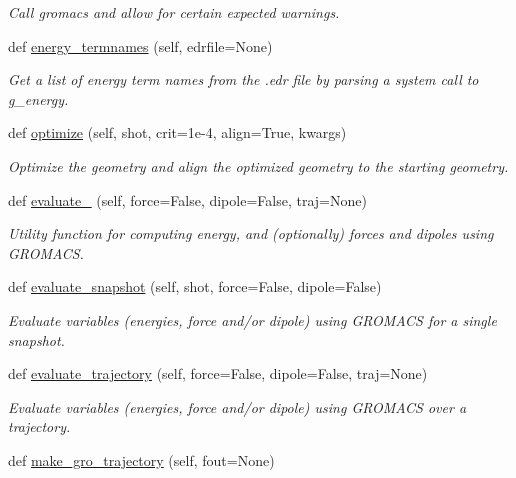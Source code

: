 \begin{DoxyCompactItemize}
\begin{DoxyCompactList}\small\item\em Call gromacs and allow for certain expected warnings. \end{DoxyCompactList}\item 
def \hyperlink{classsrc_1_1gmxio_1_1GMX_aa2907fefccf0791846d2bc87f38ef5fe}{energy\+\_\+termnames} (self, edrfile=None)
\begin{DoxyCompactList}\small\item\em Get a list of energy term names from the .edr file by parsing a system call to g\+\_\+energy. \end{DoxyCompactList}\item 
def \hyperlink{classsrc_1_1gmxio_1_1GMX_a92d0a874a4b720617b984cfb3f3117cf}{optimize} (self, shot, crit=1e-\/4, align=\+True, kwargs)
\begin{DoxyCompactList}\small\item\em Optimize the geometry and align the optimized geometry to the starting geometry. \end{DoxyCompactList}\item 
def \hyperlink{classsrc_1_1gmxio_1_1GMX_aece1608d0fc0b3a2a121edb09ac30f75}{evaluate\+\_\+} (self, force=False, dipole=False, traj=None)
\begin{DoxyCompactList}\small\item\em Utility function for computing energy, and (optionally) forces and dipoles using G\+R\+O\+M\+A\+CS. \end{DoxyCompactList}\item 
def \hyperlink{classsrc_1_1gmxio_1_1GMX_ac5273754ebbd61d4798b4acc4f4479bc}{evaluate\+\_\+snapshot} (self, shot, force=False, dipole=False)
\begin{DoxyCompactList}\small\item\em Evaluate variables (energies, force and/or dipole) using G\+R\+O\+M\+A\+CS for a single snapshot. \end{DoxyCompactList}\item 
def \hyperlink{classsrc_1_1gmxio_1_1GMX_ab183586fa000692169f9904269add851}{evaluate\+\_\+trajectory} (self, force=False, dipole=False, traj=None)
\begin{DoxyCompactList}\small\item\em Evaluate variables (energies, force and/or dipole) using G\+R\+O\+M\+A\+CS over a trajectory. \end{DoxyCompactList}\item 
def \hyperlink{classsrc_1_1gmxio_1_1GMX_a359787564e21019ed5baa7e436f0e523}{make\+\_\+gro\+\_\+trajectory} (self, fout=None)

\end{DoxyCompactItemize}
